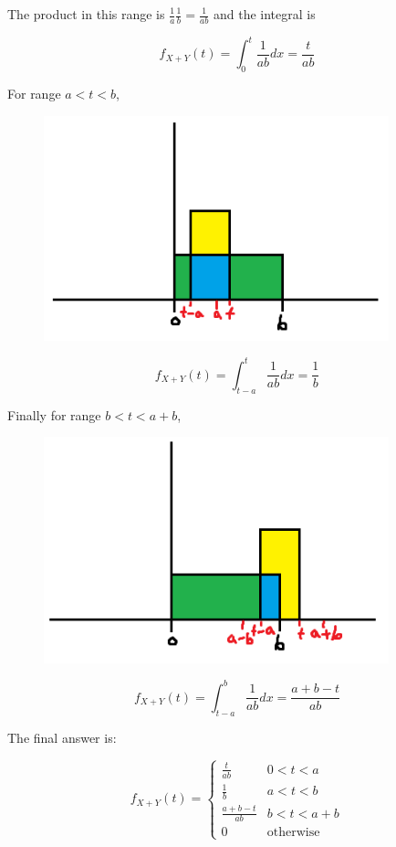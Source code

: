\begin{texample}
	The product in this range is $\frac1a \frac1b = \frac{1}{ab}$ and the integral is
	
	\[f_{X+Y}(t)=\int_0^t \frac{1}{ab} dx = \frac{t}{ab}\]
	
	For range $a<t<b$,
	
	\begin{figure}[H]
		\centering
		\includegraphics[width=100mm]{26.png}
	\end{figure}
	
	\[f_{X+Y}(t)=\int_{t-a}^t \frac{1}{ab} dx = \frac{1}{b}\]
	
	Finally for range $b<t<a+b$,
	
	\begin{figure}[H]
		\centering
		\includegraphics[width=100mm]{27.png}
	\end{figure}
	
	\[f_{X+Y}(t)=\int_{t-a}^b \frac{1}{ab} dx = \frac{a+b-t}{ab}\]
	
	The final answer is:
	
	\[f_{X+Y}(t) = \begin{cases} \frac{t}{ab} & 0 < t < a \\ \frac1b & a < t < b \\ \frac{a+b-t}{ab} & b<t<a+b \\ 0 & \text{otherwise} \end{cases}\]
	

\end{texample}
